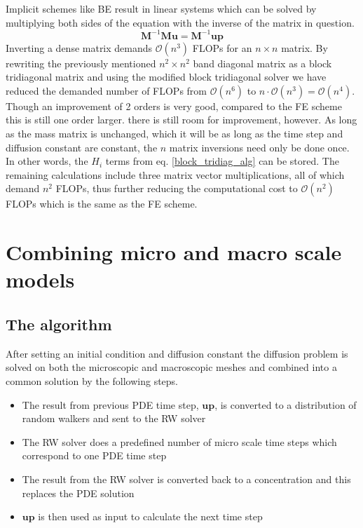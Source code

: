 Implicit schemes like BE result in linear systems which can be solved by multiplying both sides of the equation with the inverse of the matrix in question. 
\begin{equation*}
 \mathbf M^{-1}\mathbf M\mathbf u = \mathbf{M}^{-1}\mathbf{up}
\end{equation*}
Inverting a dense matrix demands $\mathcal O(n^3)$ FLOPs for an $n\times n$ matrix. 
By rewriting the previously mentioned $n^2\times n^2$ band diagonal matrix as a block tridiagonal matrix and using the modified block tridiagonal solver we have reduced the demanded number of FLOPs from $\mathcal{O}(n^6)$ to $n\cdot\mathcal{O}(n^3) = \mathcal{O}(n^4)$. 
Though an improvement of 2 orders is very good, compared to the FE scheme this is still one order larger.
there is still room for improvement, however. 
As long as the mass matrix is unchanged, which it will be as long as the time step and diffusion constant are constant, the $n$ matrix inversions need only be done once. 
In other words, the $H_i$ terms from eq. \eqref{block_tridiag_alg} can be stored. 
The remaining calculations include three matrix vector multiplications, all of which demand $n^2$ FLOPs, thus further reducing the computational cost to $\mathcal{O}(n^2)$ FLOPs which is the same as the FE scheme.

\section{Combining micro and macro scale models}

\subsection{The algorithm}
After setting an initial condition and diffusion constant the diffusion problem is solved on both the microscopic and macroscopic meshes and combined into a common solution by the following steps.
\begin{itemize}
 \item The result from previous PDE time step, $\mathbf{up}$, is converted to a distribution of random walkers and sent to the RW solver
 \item The RW solver does a predefined number of micro scale time steps which correspond to one PDE time step
 \item The result from the RW solver is converted back to a concentration and this replaces the PDE solution
 \item $\mathbf{up}$ is then used as input to calculate the next time step
\end{itemize}

